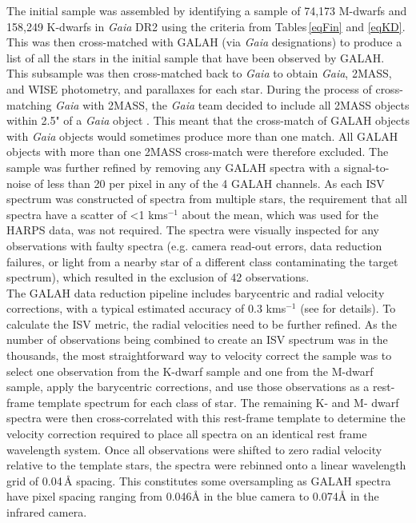 The initial sample was assembled by identifying a sample of 74,173 M-dwarfs and 158,249 K-dwarfs in \textit{Gaia} DR2 using the criteria from Tables\,\ref{eqFin} and \ref{eqKD}. This was then cross-matched with GALAH (via \textit{Gaia} designations) to produce a list of all the stars in the initial sample that have been observed by GALAH. This subsample was then cross-matched back to \textit{Gaia} to obtain \textit{Gaia}, 2MASS, and WISE photometry, and parallaxes for each star. During the process of cross-matching \textit{Gaia} with 2MASS, the \textit{Gaia} team decided to include all 2MASS objects within 2.5" of a \textit{Gaia} object \citep{2019Marrese}. This meant that the cross-match of GALAH objects with \textit{Gaia} objects would sometimes produce more than one match. All GALAH objects with more than one 2MASS cross-match were therefore excluded. The sample was further refined by removing any GALAH spectra with a signal-to-noise of less than 20 per pixel in any of the 4 GALAH channels. As each ISV spectrum was constructed of spectra from multiple stars, the requirement that all spectra have a scatter of \textless1 kms$^{-1}$ about the mean, which was used for the HARPS data, was not required. The spectra were visually inspected for any observations with faulty spectra (e.g. camera read-out errors, data reduction failures, or light from a nearby star of a different class contaminating the target spectrum), which resulted in the exclusion of 42 observations.\\ 

The GALAH data reduction pipeline includes barycentric and radial velocity corrections, with a typical estimated accuracy of 0.3 kms$^{-1}$ (see \citealt{2021Buder} for details). To calculate the ISV metric, the radial velocities need to be further refined. As the number of observations being combined to create an ISV spectrum was in the thousands, the most straightforward way to velocity correct the sample was to select one observation from the K-dwarf sample and one from the M-dwarf sample, apply the barycentric corrections, and use those observations as a rest-frame template spectrum for each class of star. The remaining K- and M- dwarf spectra were then cross-correlated with this rest-frame template to determine the velocity correction required to place all spectra on an identical rest frame wavelength system. Once all observations were shifted to zero radial velocity relative to the template stars, the spectra were rebinned onto a linear wavelength grid of 0.04\,\hbox{\AA} spacing. This constitutes some oversampling as GALAH spectra have pixel spacing ranging from 0.046\hbox{\AA} in the blue camera to 0.074\hbox{\AA} in the infrared camera.\\

